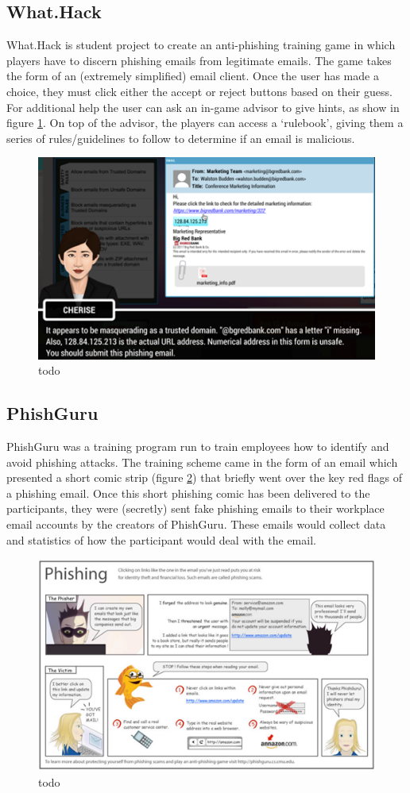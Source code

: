 \documentclass{l4proj}
\begin{document}
\subsection{What.Hack}
What.Hack \citep{wen2019hack} is student project to create an anti-phishing training game in which players have to discern phishing emails from legitimate emails. The game takes the form of an (extremely simplified) email client. Once the user has made a choice, they must click either the accept or reject buttons based on their guess. For additional help the user can ask an in-game advisor to give hints, as show in figure \ref{fig:whathack}. On top of the advisor, the players can access a ‘rulebook’, giving them a series of rules/guidelines to follow to determine if an email is malicious. 
\begin{figure}[htp]
    \centering
    \includegraphics[width=0.6\linewidth]{images/whathack.png}    
    \caption{todo}
    \label{fig:whathack} 
\end{figure}
\newline

\subsection{PhishGuru}
PhishGuru \citep{kumaraguru2008lessons} was a training program run to train employees how to identify and avoid phishing attacks. The training scheme came in the form of an email which presented a short comic strip (figure \ref{fig:phishguru}) that briefly went over the key red flags of a phishing email. Once this short phishing comic has been delivered to the participants, they were (secretly) sent fake phishing emails to their workplace email accounts by the creators of PhishGuru. These emails would collect data and statistics of how the participant would deal with the email.  
\begin{figure}[htp]
    \centering
    \includegraphics[width=0.6\linewidth]{images/phishguru.png}    
    \caption{todo}
    \label{fig:phishguru} 
\end{figure}
\end{document}
